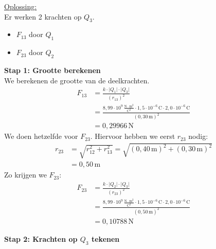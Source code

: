 \documentclass{ximera}
\begin{document}
\begin{exercise}
\begin{solution}
        \underline{Oplossing:}\\
        Er werken 2 krachten op $Q_{3}$. 
        \begin{itemize}
            \item $F_{13}$ door $Q_{1}$  
            \item $F_{23}$ door $Q_{2}$  
        \end{itemize}
        \textbf{Stap 1: Grootte berekenen}\\ 
        We berekenen de grootte van de deelkrachten.
        \begin{align*}
            F_{13}&=\frac{k\cdot\lvert Q_{1}\rvert\cdot\lvert Q_{3}\rvert}{(r_{13})^{2}} \\
            &=\frac{8{,}99 \cdot 10^9 \, \mathrm{\frac{N \cdot m^2}{C^2}} \cdot 1{,}5 \cdot 10^{-6} \, \mathrm{C} \cdot 2{,}0 \cdot 10^{-6} \, \mathrm{C}}{(0{,}30 \, \mathrm{m})^{2}} \\
            &= 0{,}29966 \, \mathrm{N}
        \end{align*}
        We doen hetzelfde voor $F_{23}$. Hiervoor hebben we eerst $r_{23}$ nodig:
        \begin{align*}
            r_{23} &= \sqrt{r_{12}^{2}+r_{13}^{2}}=\sqrt{(0{,}40 \, \mathrm{m})^{2}+(0{,}30 \, \mathrm{m})^{2}}\\
            &= 0{,}50 \, \mathrm{m}
        \end{align*}
        Zo krijgen we $F_{23}$:
        \begin{align*}
            F_{23}&=\frac{k\cdot\lvert Q_{2}\rvert\cdot\lvert Q_{3}\rvert}{(r_{23})^{2}} \\
            &=\frac{8{,}99 \cdot 10^9 \, \mathrm{\frac{N \cdot m^2}{C^2}} \cdot 1{,}5 \cdot 10^{-6} \, \mathrm{C} \cdot 2{,}0 \cdot 10^{-6} \, \mathrm{C}}{(0{,}50 \, \mathrm{m})^{2}} \\
            &= 0{,}10788 \, \mathrm{N} 
        \end{align*}

        \textbf{Stap 2: Krachten op $Q_{3}$ tekenen}  

        \begin{center}
\end{center}
\end{solution}
\end{exercise}
\end{document}
